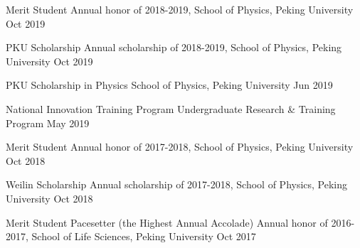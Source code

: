 




\begin{cvhonors}



\cvhonor
{Merit Student} %
{Annual honor of 2018-2019, School of Physics, Peking University} %
{} %
{Oct 2019} %


\cvhonor
{PKU Scholarship} %
{Annual scholarship of 2018-2019, School of Physics, Peking University} %
{} %
{Oct 2019} %

\cvhonor
{PKU Scholarship in Physics} %
{School of Physics, Peking University} %
{} %
{Jun 2019} %


\cvhonor
{National Innovation Training Program} %
{Undergraduate Research \& Training Program} %
{} %
{May 2019} %


\cvhonor
{Merit Student} %
{Annual honor of 2017-2018, School of Physics, Peking University} %
{} %
{Oct 2018} %


\cvhonor
{Weilin Scholarship} %
{Annual scholarship of 2017-2018, School of Physics, Peking University} %
{} %
{Oct 2018} %


\cvhonor
{Merit Student Pacesetter (the Highest Annual Accolade)} %
{Annual honor of 2016-2017, School of Life Sciences, Peking University} %
{} %
{Oct 2017} %


\end{cvhonors}
